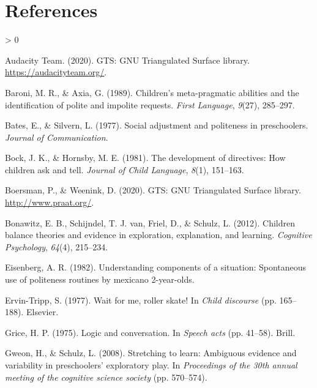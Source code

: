 \documentclass[
  english,
  man,floatsintext]{apa6}
\newlength{\cslhangindent}
\newenvironment{CSLReferences}[2] %
 {%
  \setlength{\parindent}{0pt}
  \ifodd #1 \everypar{\setlength{\hangindent}{\cslhangindent}}\ignorespaces\fi
  \ifnum #2 > 0
  \setlength{\parskip}{#2\baselineskip}
  \fi
 }%
 {}
\begin{document}
\newpage

\hypertarget{references}{%
\section{References}\label{references}}

\begingroup
\setlength{\parindent}{-0.5in}
\setlength{\leftskip}{0.5in}

\hypertarget{refs}{}
\begin{CSLReferences}{1}{0}
\leavevmode\hypertarget{ref-audacity2020}{}%
Audacity Team. (2020). {GTS}: {GNU} {Triangulated} {Surface} library. \url{https://audacityteam.org/}.

\leavevmode\hypertarget{ref-baroni1989}{}%
Baroni, M. R., \& Axia, G. (1989). Children's meta-pragmatic abilities and the identification of polite and impolite requests. \emph{First Language}, \emph{9}(27), 285--297.

\leavevmode\hypertarget{ref-bates1977}{}%
Bates, E., \& Silvern, L. (1977). Social adjustment and politeness in preschoolers. \emph{Journal of Communication}.

\leavevmode\hypertarget{ref-bock1981}{}%
Bock, J. K., \& Hornsby, M. E. (1981). The development of directives: How children ask and tell. \emph{Journal of Child Language}, \emph{8}(1), 151--163.

\leavevmode\hypertarget{ref-boersman2020}{}%
Boersman, P., \& Weenink, D. (2020). {GTS}: {GNU} {Triangulated} {Surface} library. \url{http://www.praat.org/}.

\leavevmode\hypertarget{ref-bonawitz2012}{}%
Bonawitz, E. B., Schijndel, T. J. van, Friel, D., \& Schulz, L. (2012). Children balance theories and evidence in exploration, explanation, and learning. \emph{Cognitive Psychology}, \emph{64}(4), 215--234.

\leavevmode\hypertarget{ref-eisenberg1982}{}%
Eisenberg, A. R. (1982). Understanding components of a situation: Spontaneous use of politeness routines by mexicano 2-year-olds.

\leavevmode\hypertarget{ref-ervintripp1977}{}%
Ervin-Tripp, S. (1977). Wait for me, roller skate! In \emph{Child discourse} (pp. 165--188). Elsevier.

\leavevmode\hypertarget{ref-grice1975}{}%
Grice, H. P. (1975). Logic and conversation. In \emph{Speech acts} (pp. 41--58). Brill.

\leavevmode\hypertarget{ref-gweon2008}{}%
Gweon, H., \& Schulz, L. (2008). Stretching to learn: Ambiguous evidence and variability in preschoolers' exploratory play. In \emph{Proceedings of the 30th annual meeting of the cognitive science society} (pp. 570--574).


\end{CSLReferences}
\end{document}

